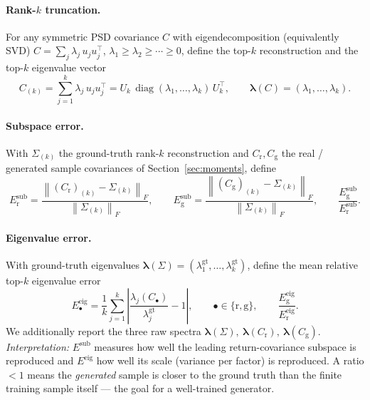 \documentclass[11pt]{article}
\newcommand{\norm}[1]{\left\lVert #1 \right\rVert}
\newcommand{\fro}[1]{\norm{#1}_{F}}
\newcommand{\T}{^{\!\top}}
\newcommand{\diag}{\operatorname{diag}}
\begin{document}
\paragraph{Rank-$k$ truncation.}
For any symmetric PSD covariance $C$ with eigendecomposition (equivalently SVD)
$C = \sum_{j} \lambda_j\,u_j u_j\T$, $\lambda_1\ge\lambda_2\ge\cdots\ge0$, define
the top-$k$ reconstruction and the top-$k$ eigenvalue vector
\begin{equation}
  C_{(k)} = \sum_{j=1}^{k}\lambda_j\,u_j u_j\T
          = U_k\,\diag(\lambda_1,\dots,\lambda_k)\,U_k\T,
  \qquad
  \bm\lambda(C) = (\lambda_1,\dots,\lambda_k).
\end{equation}

\paragraph{Subspace error.}
With $\Sigma_{(k)}$ the ground-truth rank-$k$ reconstruction and
$C_{\mathrm r},C_{\mathrm g}$ the real / generated sample covariances of
Section~\ref{sec:moments}, define
\begin{equation}
  E^{\mathrm{sub}}_{\mathrm r} = \frac{\fro{(C_{\mathrm r})_{(k)} - \Sigma_{(k)}}}{\fro{\Sigma_{(k)}}},
  \qquad
  E^{\mathrm{sub}}_{\mathrm g} = \frac{\fro{(C_{\mathrm g})_{(k)} - \Sigma_{(k)}}}{\fro{\Sigma_{(k)}}},
  \qquad
  \frac{E^{\mathrm{sub}}_{\mathrm g}}{E^{\mathrm{sub}}_{\mathrm r}}.
  \label{eq:suberr}
\end{equation}

\paragraph{Eigenvalue error.}
With ground-truth eigenvalues $\bm\lambda(\Sigma)=(\lambda^{\mathrm{gt}}_1,\dots,\lambda^{\mathrm{gt}}_k)$,
define the mean relative top-$k$ eigenvalue error
\begin{equation}
  E^{\mathrm{eig}}_{\bullet}
    = \frac{1}{k}\sum_{j=1}^{k}
      \left|\frac{\lambda_j(C_\bullet)}{\lambda^{\mathrm{gt}}_j} - 1\right|,
    \qquad \bullet\in\{\mathrm r,\mathrm g\},
    \qquad
    \frac{E^{\mathrm{eig}}_{\mathrm g}}{E^{\mathrm{eig}}_{\mathrm r}}.
  \label{eq:eigerr}
\end{equation}
We additionally report the three raw spectra
$\bm\lambda(\Sigma),\ \bm\lambda(C_{\mathrm r}),\ \bm\lambda(C_{\mathrm g})$.
\emph{Interpretation:} $E^{\mathrm{sub}}$ measures how well the leading
return-covariance subspace is reproduced and $E^{\mathrm{eig}}$ how well its
scale (variance per factor) is reproduced. A ratio $<1$ means the
\emph{generated} sample is closer to the ground truth than the finite training
sample itself --- the goal for a well-trained generator.
\end{document}
